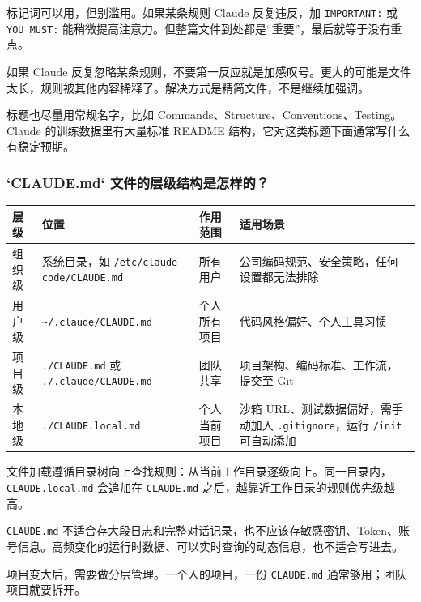 \documentclass[10pt,a4paper]{ctexart}
\begin{document}
标记词可以用，但别滥用。如果某条规则 Claude 反复违反，加 \texttt{IMPORTANT:} 或 \texttt{YOU MUST:} 能稍微提高注意力。但整篇文件到处都是“重要”，最后就等于没有重点。



如果 Claude 反复忽略某条规则，不要第一反应就是加感叹号。更大的可能是文件太长，规则被其他内容稀释了。解决方式是精简文件，不是继续加强调。



标题也尽量用常规名字，比如 Commands、Structure、Conventions、Testing。Claude 的训练数据里有大量标准 README 结构，它对这类标题下面通常写什么有稳定预期。



\subsubsection{`CLAUDE.md` 文件的层级结构是怎样的？}

{\footnotesize
\begin{tabularx}{\textwidth}{|X|X|X|X|}
\hline
\textbf{层级} & \textbf{位置} & \textbf{作用范围} & \textbf{适用场景} \\
\hline
组织级 & 系统目录，如 \texttt{/etc/claude-code/CLAUDE.md} & 所有用户 & 公司编码规范、安全策略，任何设置都无法排除 \\
\hline
用户级 & \texttt{\textasciitilde{}/.claude/CLAUDE.md} & 个人所有项目 & 代码风格偏好、个人工具习惯 \\
\hline
项目级 & \texttt{./CLAUDE.md} 或 \texttt{./.claude/CLAUDE.md} & 团队共享 & 项目架构、编码标准、工作流，提交至 Git \\
\hline
本地级 & \texttt{./CLAUDE.local.md} & 个人当前项目 & 沙箱 URL、测试数据偏好，需手动加入 \texttt{.gitignore}，运行 \texttt{/init} 可自动添加 \\
\hline
\end{tabularx}
}



文件加载遵循目录树向上查找规则：从当前工作目录逐级向上。同一目录内，\texttt{CLAUDE.local.md} 会追加在 \texttt{CLAUDE.md} 之后，越靠近工作目录的规则优先级越高。



\texttt{CLAUDE.md} 不适合存大段日志和完整对话记录，也不应该存敏感密钥、Token、账号信息。高频变化的运行时数据、可以实时查询的动态信息，也不适合写进去。



项目变大后，需要做分层管理。一个人的项目，一份 \texttt{CLAUDE.md} 通常够用；团队项目就要拆开。
\end{document}
